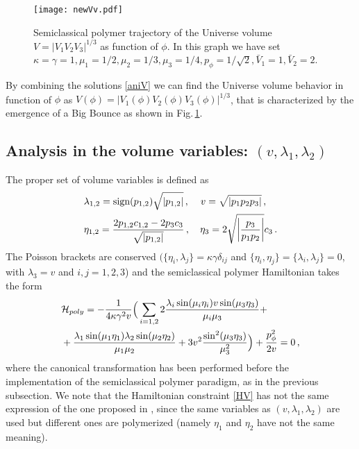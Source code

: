 \documentclass[aps,prd,twocolumn,nofootinbib,superscriptaddress]{revtex4-2}
\newcommand{\sign}{\text{sign}}
\begin{document}
\begin{figure}[htbp]
	\centering
	\texttt{[image: newVv.pdf]}
	\caption{Semiclassical polymer trajectory of the Universe volume $V=|V_1V_2V_3|^{1/3}$ as function of $\phi$. In this graph we have set $\kappa=\gamma=1,\mu_1=1/2,\mu_2=1/3,\mu_3=1/4,p_\phi=1/\sqrt{2},\bar{V}_1=1,\bar{V}_2=2$.}
	\label{Vv}
\end{figure}
By combining the solutions \eqref{aniV} we can find the Universe volume behavior in function of $\phi$ as $V(\phi)=|V_1(\phi)V_2(\phi)V_3(\phi)|^{1/3}$, that is characterized by the emergence of a Big Bounce as shown in Fig.$\,$\ref{Vv}.

\subsection{Analysis in the volume variables: $(v,\lambda_{1},\lambda_{2})$}
\label{SecV}
The proper set of volume variables is defined as
\begin{equation}
	\label{pv}	
	\begin{aligned}
	&\lambda_{1,2}=\sign(p_{1,2})\sqrt{|p_{1,2}|}\,, \hspace{0.4cm} v=\sqrt{|p_1p_2p_3|}\,,\\
	&\eta_{1,2}=\frac{2p_{1,2}c_{1,2}-2p_3c_3}{\sqrt{|p_{1,2}|}}\,,\quad\eta_3=2\sqrt{\bigg|\frac{p_3}{p_1p_2}\bigg|}c_3\,.
	\end{aligned}
\end{equation}
The Poisson brackets are conserved $(\{\eta_i,\lambda_j\}=\kappa\gamma\delta_{ij}$ and $\{\eta_i,\eta_j\}=\{\lambda_i,\lambda_j\}=0$, with $\lambda_3=v$ and $i,j=1,2,3$) and the semiclassical polymer Hamiltonian takes the form
\begin{equation}
	\begin{aligned}
	\label{HV}
	&\mathcal{H}_{poly}=-{1\over{4\kappa\gamma^{2}v}}\Big(\sum_{i=1,2}2{\lambda_{i}\sin(\mu_{i}\eta_{i})v\sin(\mu_{3}\eta_{3})\over\mu_{i}\mu_{3}}+\\&+{\lambda_{1}\sin(\mu_{1}\eta_{1})\lambda_{2}\sin(\mu_{2}\eta_{2})\over\mu_{1}\mu_{2}}+3v^2\frac{\sin^2(\mu_3\eta_3)}{\mu_3^2}\Big)+{p_{\phi}^{2}\over 2 v}=0\,,
	\end{aligned}
\end{equation}
where the canonical transformation has been performed before the implementation of the semiclassical polymer paradigm, as in the previous subsection. We note that the Hamiltonian constraint \eqref{HV} has not the same expression of the one proposed in \cite{ashtekar2009}, since the same variables as $(v,\lambda_1,\lambda_2)$ are used but different ones are polymerized (namely $\eta_1$ and $\eta_2$ have not the same meaning).
\end{document}
